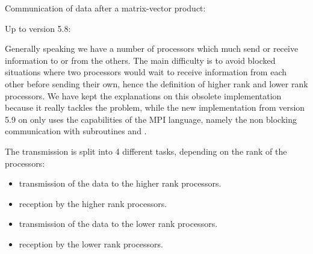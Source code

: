 Communication of data after a matrix-vector product:

Up to version 5.8:

Generally speaking we have a number of processors which much send or receive
information to or from the others. The main difficulty is to avoid blocked
situations where two processors would wait to receive information from each
other before sending their own, hence the definition of higher rank and lower
rank processors. We have kept the explanations on this obsolete implementation
because it really tackles the problem, while the new implementation from
version 5.9 on only uses the capabilities of the MPI language, namely the non
blocking communication with subroutines  and
.

The transmission is split into 4 different tasks, depending on the rank of the processors:
\begin{itemize}
  \item transmission of the data to the higher rank processors.
  \item reception by the higher rank processors.
  \item transmission of the data to the lower rank processors.
  \item reception by the lower rank processors.
\end{itemize}

